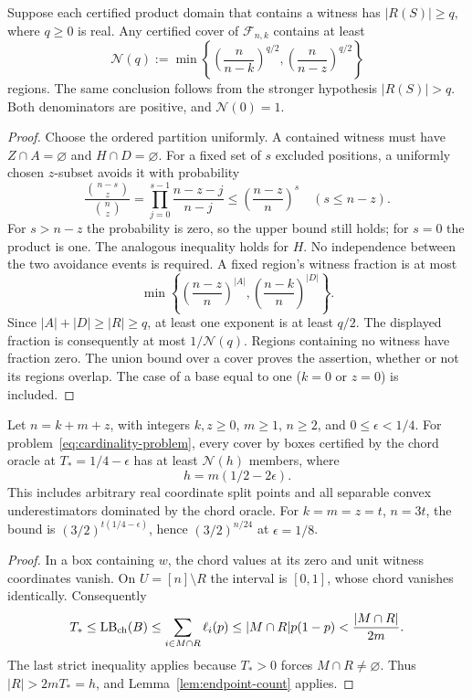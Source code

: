 \begin{lemma}\label{lem:endpoint-count}
Suppose each certified product domain that contains a witness has
$|R(S)|\ge q$, where $q\ge0$ is real. Any certified cover of
$\mathcal F_{n,k}$ contains at least
\begin{equation}\label{eq:cardinality-cover}
 \mathcal N(q):=
 \min\left\{\left(\frac n{n-k}\right)^{q/2},
                 \left(\frac n{n-z}\right)^{q/2}\right\}
\end{equation}
regions. The same conclusion follows from the stronger hypothesis
$|R(S)|>q$. Both denominators are positive, and $\mathcal N(0)=1$.
\end{lemma}
\begin{proof}
Choose the ordered partition uniformly. A contained witness must have
$Z\cap A=\varnothing$ and $H\cap D=\varnothing$. For a fixed set of
$s$ excluded positions, a uniformly chosen $z$-subset avoids it with
probability
\[
 \frac{\binom{n-s}{z}}{\binom nz}
 =\prod_{j=0}^{s-1}\frac{n-z-j}{n-j}
 \le\left(\frac{n-z}{n}\right)^s
 \quad(s\le n-z).
\]
For $s>n-z$ the probability is zero, so the upper bound still holds;
for $s=0$ the product is one. The analogous inequality holds for $H$.
No independence between the two avoidance events is required. A fixed
region's witness fraction is at most
\[
 \min\left\{\left(\frac{n-z}{n}\right)^{|A|},
               \left(\frac{n-k}{n}\right)^{|D|}\right\}.
\]
Since $|A|+|D|\ge |R|\ge q$, at least one exponent is at least $q/2$.
The displayed fraction is consequently at most $1/\mathcal N(q)$.
Regions containing no witness have fraction zero. The union bound over a
cover proves the assertion, whether or not its regions overlap. The case
of a base equal to one ($k=0$ or $z=0$) is included.
\end{proof}

\begin{theorem}\label{thm:chord-cover}
Let $n=k+m+z$, with integers $k,z\ge0$, $m\ge1$, $n\ge2$, and
$0\le\epsilon<1/4$. For problem~\eqref{eq:cardinality-problem}, every
cover by boxes certified by the chord oracle at
$T_*=1/4-\epsilon$ has at least $\mathcal N(h)$ members, where
\begin{equation}\label{eq:chord-h}
 h=m(1/2-2\epsilon).
\end{equation}
This includes arbitrary real coordinate split points and all separable
convex underestimators dominated by the chord oracle. For
$k=m=z=t$, $n=3t$, the bound is
$(3/2)^{t(1/4-\epsilon)}$, hence $(3/2)^{n/24}$ at $\epsilon=1/8$.
\end{theorem}
\begin{proof}
In a box containing $w$, the chord values at its zero and unit witness
coordinates vanish. On $U=[n]\setminus R$ the interval is $[0,1]$,
whose chord vanishes identically. Consequently
\[
 T_*\le\operatorname{LB}_{\rm ch}(B)
 \le\sum_{i\in M\cap R}\ell_i(p)
 \le |M\cap R|p(1-p)<\frac{|M\cap R|}{2m}.
\]
The last strict inequality applies because $T_*>0$ forces
$M\cap R\ne\varnothing$. Thus $|R|>2mT_*=h$, and
Lemma~\ref{lem:endpoint-count} applies.
\end{proof}

